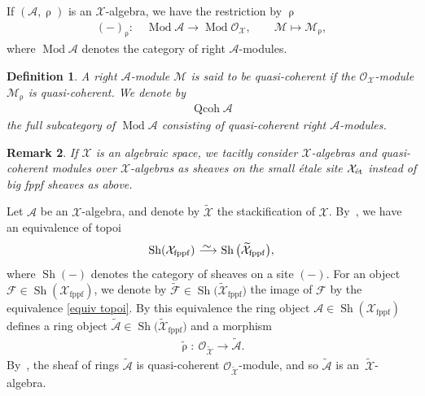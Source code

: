 \documentclass[10pt,a4paper]{amsart}
\newtheorem{dfn}{Definition}[section]
\newtheorem{rem}[dfn]{Remark}
\numberwithin{equation}{section}
\newcommand{\Qcoh}{\operatorname{Qcoh}}
\newcommand{\Mod}{\operatorname{Mod}}
\newcommand{\fppf}{\operatorname{fppf}}
\newcommand{\Sh}{\operatorname{Sh}}
\newcommand{\et}{\text{\rm \'et}}
\newcommand{\cA}{\mathcal{A}}
\newcommand{\cF}{\mathcal{F}}
\newcommand{\cM}{\mathcal{M}}
\newcommand{\cO}{\mathcal{O}}
\newcommand{\cX}{\mathcal{X}}
\newcommand{\simto}{\,\,\,\,\raisebox{4pt}{$\sim$}{\kern -1.1em \longrightarrow}\,}
\begin{document}
 If $(\cA,\uprho)$ is an $\cX$-algebra, we have the restriction by $\uprho$
 \begin{gather*}
 (-)_{\uprho}\colon\quad \Mod\cA\to \Mod\cO_{\cX}, \qquad \cM\mapsto \cM_{\uprho},
 \end{gather*}
 where $ \Mod\cA$ denotes the category of right $\cA$-modules.
 \begin{dfn} A right $\cA$-module $\cM$ is said to be {\it quasi-coherent} if the $\cO_{\cX}$-module $\cM_{\uprho}$ is quasi-coherent. We denote by
 \begin{gather*}
 \Qcoh\cA
 \end{gather*}
 the full subcategory of $\Mod\cA$ consisting of quasi-coherent right $\cA$-modules.
 \end{dfn}

 \begin{rem}
 If $\cX$ is an algebraic space, we tacitly consider $\cX$-algebras and quasi-coherent modules over $\cX$-algebras as sheaves on the small \'etale site $\cX_{\et}$ instead of big fppf sheaves as above.
 \end{rem}



Let $\cA$ be an $\cX$-algebra, and denote by $\widetilde{\cX}$ the stackification of $\cX$. By~\cite[Lemma~12.1; 06WQ]{stacks}, we have an equivalence of topoi
\begin{equation}\label{equiv topoi}
\Sh(\cX_{\fppf})\simto \Sh\big(\widetilde{\cX}_{\fppf}\big),
\end{equation}
where $\Sh(-)$ denotes the category of sheaves on a site $(-)$. For an object $\cF\in \Sh(\cX_{\fppf})$, we denote by $\widetilde{\cF}\in\Sh\big(\widetilde{\cX}_{\fppf}\big)$ the image of $\cF$ by the equivalence \eqref{equiv topoi}.
By this equivalence the ring object $\cA\in\Sh(\cX_{\fppf})$ defines a ring object $\widetilde{\cA}\in\Sh\big(\widetilde{\cX}_{\fppf}\big)$ and a morphism
\begin{gather*}
\widetilde{\uprho}\colon\ \cO_{\widetilde{\cX}}\to \widetilde{\cA}.
\end{gather*}
By~\cite[Lemma~12.2; 06WR]{stacks}, the sheaf of rings $\widetilde{\cA}$ is quasi-coherent $\cO_{\widetilde{\cX}}$-module, and so $\widetilde{\cA}$ is an~$\widetilde{\cX}$-algebra.
\end{document}
